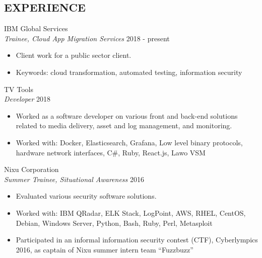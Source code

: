 \documentclass[margin, 10pt]{res} %
\begin{document}
\begin{resume}

%
%

 
\section{EXPERIENCE}
  
IBM Global Services\\
{\sl Trainee, Cloud App Migration Services} \hfill 2018 - present
\begin{itemize} \itemsep -2pt %
\item Client work for a public sector client.
\item Keywords: cloud transformation, automated testing, information security
\end{itemize}

\addvspace{-7pt}
TV Tools\\
{\sl Developer} \hfill 2018
\begin{itemize} \itemsep -2pt %
\item Worked as a software developer on various front and back-end solutions related to media delivery, asset and log management, and monitoring.
\item Worked with: Docker, Elasticsearch, Grafana, Low level binary protocols, hardware network interfaces, C\#, Ruby, React.js, Lawo VSM
\end{itemize}

\addvspace{-7pt}
Nixu Corporation\\
{\sl Summer Trainee, Situational Awareness} \hfill 2016
\begin{itemize} \itemsep -2pt %
\item Evaluated various security software solutions.
\item Worked with:  IBM QRadar, ELK Stack, LogPoint, AWS, RHEL, CentOS, Debian, Windows Server, Python, Bash, Ruby, Perl, Metasploit
\item Participated in an informal information security contest (CTF), Cyberlympics 2016, as captain of Nixu summer intern team ``Fuzzbuzz''  
\end{itemize}


\end{resume}
\end{document}
